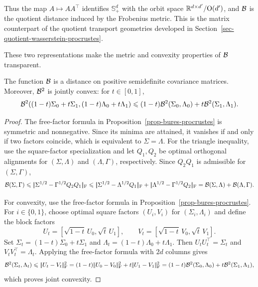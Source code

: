 Thus the map $A\mapsto AA^\top$ identifies $\mathbb S_+^d$ with the orbit
space $\mathbb{R}^{d\times d'}/\mathrm O(d')$, and $\mathcal{B}$ is the quotient distance
induced by the Frobenius metric. This is the matrix counterpart of the quotient
transport geometries developed in
Section~\ref{sec-quotient-wasserstein-procrustes}.

These two representations make the metric and convexity properties of $\mathcal{B}$ transparent.

\begin{prop}\label{prop-bures-metric-convex}
	The function $\mathcal{B}$ is a distance on positive semidefinite covariance matrices. Moreover, $\mathcal{B}^2$ is jointly convex: for $t\in[0,1]$,
	\[
		\mathcal{B}^2((1-t)\Sigma_0+t\Sigma_1,(1-t)\Lambda_0+t\Lambda_1)
		\leqslant
		(1-t)\mathcal{B}^2(\Sigma_0,\Lambda_0)+t\mathcal{B}^2(\Sigma_1,\Lambda_1).
	\]
\end{prop}
\begin{proof}
	The free-factor formula in Proposition~\ref{prop-bures-procrustes} is
	symmetric and nonnegative. Since its minima are attained, it vanishes if and
	only if two factors coincide, which is equivalent to $\Sigma=\Lambda$.
	For the triangle inequality, use the square-factor specialization and let
	$Q_1,Q_2$ be optimal orthogonal alignments for $(\Sigma,\Lambda)$ and
	$(\Lambda,\Gamma)$, respectively.
	Since $Q_2Q_1$ is admissible for $(\Sigma,\Gamma)$,
	\[
		\mathcal{B}(\Sigma,\Gamma)
		\leqslant
		|\!| \Sigma^{1/2}-\Gamma^{1/2}Q_2Q_1 |\!|_{\mathrm F}
		\leqslant
		|\!| \Sigma^{1/2}-\Lambda^{1/2}Q_1 |\!|_{\mathrm F}
		+
		|\!| \Lambda^{1/2}-\Gamma^{1/2}Q_2 |\!|_{\mathrm F}
		=
		\mathcal{B}(\Sigma,\Lambda)+\mathcal{B}(\Lambda,\Gamma).
	\]

	For convexity, use the free-factor formula in
	Proposition~\ref{prop-bures-procrustes}. For $i\in\{0,1\}$, choose optimal
	square factors $(U_i,V_i)$ for $(\Sigma_i,\Lambda_i)$ and define the block
	factors
	\[
		U_t=[\sqrt{1-t}\,U_0,\sqrt t\,U_1],
		\qquad
		V_t=[\sqrt{1-t}\,V_0,\sqrt t\,V_1].
	\]
	Set $\Sigma_t=(1-t)\Sigma_0+t\Sigma_1$ and
	$\Lambda_t=(1-t)\Lambda_0+t\Lambda_1$. Then
	$U_tU_t^\top=\Sigma_t$ and $V_tV_t^\top=\Lambda_t$. Applying the
		free-factor formula with $2d$ columns gives
		\[
			\mathcal{B}^2(\Sigma_t,\Lambda_t)
			\leqslant|\!| U_t-V_t |\!|_{\mathrm F}^2
			=(1-t)|\!| U_0-V_0 |\!|_{\mathrm F}^2+t|\!| U_1-V_1 |\!|_{\mathrm F}^2
			=(1-t)\mathcal{B}^2(\Sigma_0,\Lambda_0)+t\mathcal{B}^2(\Sigma_1,\Lambda_1),
		\]
	which proves joint convexity.
\end{proof}

